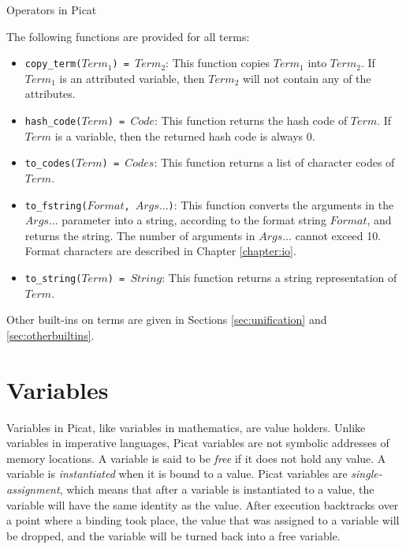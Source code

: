 \begin{table}
\caption{\label{tab:ops}Operators in Picat}

\end{table}

The following functions are provided for all terms:
\begin{itemize}
\item \texttt{copy\_term($Term_1$) = $Term_2$}: This function copies $Term_1$ into $Term_2$.  If $Term_1$ is an attributed variable, then $Term_2$ will not contain any of the attributes.
\item \texttt{hash\_code($Term$) = $Code$}: This function returns the hash code of $Term$. If $Term$ is a variable, then the returned hash code is always 0.
\item \texttt{to\_codes($Term$) = $Codes$}: This function returns a list of character codes of $Term$.
\item \texttt{to\_fstring($Format$, $Args\ldots$)}: This function converts the arguments in the $Args\ldots$ parameter into a string, according to the format string $Format$, and returns the string. The number of arguments in $Args\ldots$ cannot exceed 10. Format characters are described in Chapter \ref{chapter:io}.
\item \texttt{to\_string($Term$) = $String$}: This function returns a string representation of $Term$.
\end{itemize}
Other built-ins on terms are given in Sections \ref{sec:unification} and \ref{sec:otherbuiltins}.

\section{Variables}
Variables in Picat, like variables in mathematics, are value holders. Unlike variables in imperative languages, Picat variables are not symbolic addresses of memory locations. A variable is said to be \emph{free} if it does not hold any value. A variable is \emph{instantiated} when it is bound to a value. Picat variables are \emph{single-assignment}, which means that after a variable is instantiated to a value, the variable will have the same identity as the value. After execution backtracks over a point where a binding took place, the value that was assigned to a variable will be dropped, and the variable will be turned back into a free variable.

